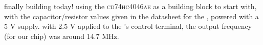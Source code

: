 finally building today! using the \textsc{cd74hc4046ae} as a \pll building
block to start with, with the capacitor/resistor values given in the datasheet
for the \vco, powered with a 5 V supply. with 2.5 V applied to the \vco's
control terminal, the output frequency (for our chip) was around 14.7 MHz.
